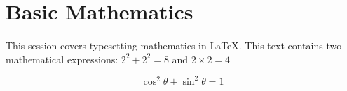 \documentclass{article}
\begin{document}
	\section{Basic Mathematics}
    \paragraph{}
    This session covers typesetting mathematics in LaTeX. This text contains two mathematical expressions: 
    $ 2^{2} + 2^{2} = 8$ and $ 2 \times 2 = 4$

    \[ \cos^2 \theta + \sin^2 \theta = 1\]
\end{document}
